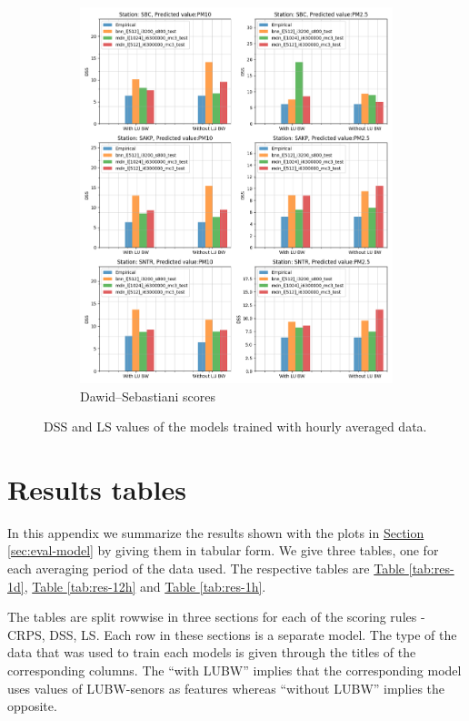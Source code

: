 \documentclass[12pt,a4paper,twoside]{scrartcl}
\numberwithin{equation}{section}
\newcommand{\refsec}[1]{\hyperref[#1]{Section \ref*{#1}}}
\newcommand{\reftab}[1]{\hyperref[#1]{Table \ref*{#1}}}
\newcounter{mypagecount}%
\newenvironment{interlude}{%
  \clearpage
  \setcounter{mypagecount}{\value{page}}%
  \thispagestyle{empty}%
  \pagestyle{empty}%
}{%
  \clearpage
  \setcounter{page}{\value{mypagecount}}%
}
\let\chapter=\section %
\begin{document}
\begin{interlude}
\begin{appendices}
\begin{figure}[h!]
\begin{subfigure}[t]{0.49\textwidth}
        \includegraphics[width=\textwidth,height=1.2\textwidth]{figures/figs_1h/results_plot_DSS}%
        \caption{Dawid–Sebastiani scores}
      \end{subfigure}
      \caption[DSS and LS of the models (hourly averaged data)]{DSS and LS values of the models trained with hourly averaged data.}
    \end{figure}

    

    \clearpage
    \chapter{Results tables}\label{app:d}
    In this appendix we summarize the results shown with the plots in \refsec{sec:eval-model} by giving them in tabular form. We give three tables, one for each averaging period of the data used. The respective tables are \reftab{tab:res-1d}, \reftab{tab:res-12h} and \reftab{tab:res-1h}.

    The tables are split rowwise in three sections for each of the scoring rules - CRPS, DSS, LS. Each row in these sections is a separate model. The type of the data that was used to train each models is given through the titles of the corresponding columns. The ``with LUBW'' implies that the corresponding model uses values of LUBW-senors as features whereas ``without LUBW'' implies the opposite.


\end{appendices}
\end{interlude}
\end{document}
